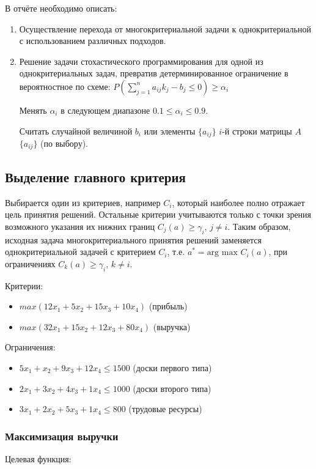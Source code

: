 В отчёте необходимо описать:
\begin{enumerate}
	\item Осуществление перехода от многокритериальной задачи к однокритериальной с использованием различных подходов.
	\item Решение задачи стохастического программирования для одной из однокритериальных задач, превратив детерминированное ограничение в вероятностное по схеме:
	$P(\sum\limits_{j=1}^n a_{ij}k_j-b_j\leq0)\geq\alpha_i$
	
	Менять $\alpha_i$ в следующем диапазоне $0.1 \leq \alpha_i \leq 0.9$.
	
	Считать случайной величиной $b_i$ или элементы $\{a_{ij}\}$ $i$-й строки матрицы $A$ $\{a_{ij}\}$ (по выбору).
\end{enumerate}

\subsection{Выделение главного критерия}
Выбирается один из критериев, например $C_i$, который наиболее полно отражает цель принятия решений. Остальные критерии учитываются только с точки зрения возможного указания их нижних границ $C_j(a) \geq \gamma_i$, $ j\neq i$. Таким образом, исходная задача многокритериального принятия решений заменяется однокритериальной задачей с критерием $C_i$, т.е. $a^* = \text{arg max } C_i(a)$, при ограничениях $C_k (a) \geq \gamma_i$, $k\neq i$.

Критерии:
\begin{itemize}
\item $max (12x_1+5x_2+15x_3+10x_4)$ (прибыль)
\item $max (32x_1+15x_2+12x_3+80x_4)$ (выручка)
\end{itemize}

Ограничения:
\begin{itemize}
\item $5x_1+x_2+9x_3+12x_4 \leq 1500$ (доски первого типа)
\item $2x_1+3x_2+4x_3+1x_4 \leq 1000$ (доски второго типа)
\item $3x_1+2x_2+5x_3+1x_4 \leq 800$ (трудовые ресурсы)
\end{itemize}

\subsubsection{Максимизация выручки}

Целевая функция:

